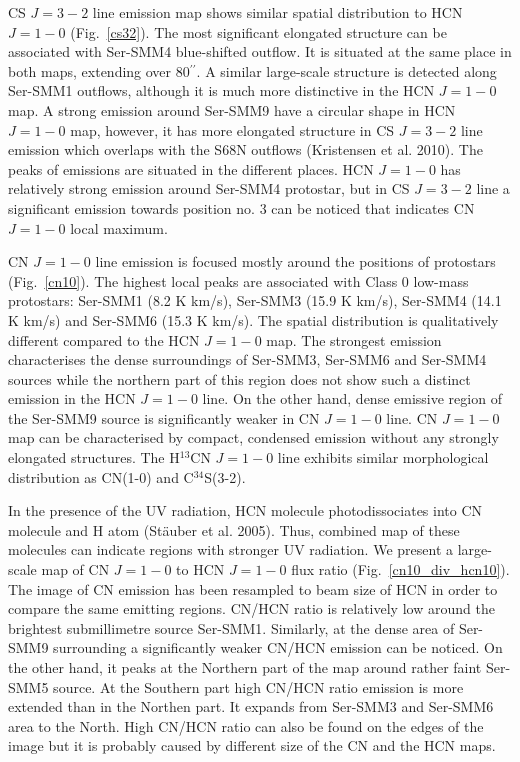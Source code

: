 \documentclass{aa}
\begin{document}
CS $J=3-2$ line emission map shows similar spatial distribution to HCN $J=1-0$ (Fig.~\ref{cs32}). The most significant elongated structure can be associated with Ser-SMM4 blue-shifted outflow. It is situated at the same place in both maps, extending over 80$^{\prime\prime}$. A similar large-scale structure is detected along Ser-SMM1 outflows, although it is much more distinctive in the HCN $J=1-0$ map. A strong emission around Ser-SMM9 have a circular shape in HCN $J=1-0$ map, however, it has more elongated structure in CS $J=3-2$ line emission which overlaps with the S68N outflows (Kristensen et al. 2010). The peaks of emissions are situated in the different places. HCN $J=1-0$ has relatively strong emission around Ser-SMM4 protostar, but in CS $J=3-2$ line a significant emission towards position no. 3 can be noticed that indicates CN $J=1-0$ local maximum. 

CN $J=1-0$ line emission is focused mostly around the positions of protostars (Fig.~\ref{cn10}). 
The highest local peaks are associated with Class 0 low-mass protostars: Ser-SMM1 (8.2 K \dot km/s), Ser-SMM3 (15.9 K \dot km/s), Ser-SMM4 (14.1 K \dot km/s) and Ser-SMM6 (15.3 K \dot km/s). The spatial distribution is qualitatively different compared to the HCN $J=1-0$ map. The strongest emission characterises the dense surroundings of Ser-SMM3, Ser-SMM6 and Ser-SMM4 sources while the northern part of this region does not show such a distinct emission in the HCN $J=1-0$ line. On the other hand, dense emissive region of the Ser-SMM9 source is significantly weaker in CN $J=1-0$ line. CN $J=1-0$ map can be characterised by compact, condensed emission without any strongly elongated structures. The H$^{13}$CN $J=1-0$ line exhibits similar morphological distribution as CN(1-0) and \mbox{C$^{34}$S(3-2)}. 

In the presence of the UV radiation, HCN molecule photodissociates into CN molecule and H atom (Stäuber et al. 2005). Thus, combined map of these molecules can indicate regions with stronger UV radiation. We present a large-scale map of CN $J=1-0$ to HCN $J=1-0$ flux ratio (Fig.~\ref{cn10_div_hcn10}). The image of CN emission has been resampled to beam size of HCN in order to compare the same emitting regions. CN/HCN ratio is relatively low around the brightest submillimetre source Ser-SMM1. Similarly, at the dense area of Ser-SMM9 surrounding a significantly weaker CN/HCN emission can be noticed. On the other hand, it peaks at the Northern part of the map around rather faint Ser-SMM5 source. At the Southern part high CN/HCN ratio emission is more extended than in the Northen part. It expands from Ser-SMM3 and Ser-SMM6 area to the North. High CN/HCN ratio can also be found on the edges of the image but it is probably caused by different size of the CN and the HCN maps.
\end{document}
